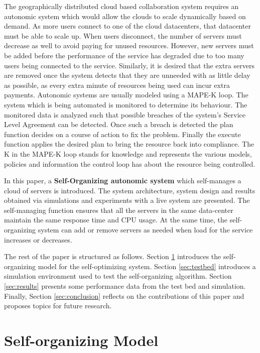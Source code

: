 \documentclass[conference]{IEEEtran}
\begin{document}
The geographically distributed cloud based collaboration system requires an autonomic system which would allow the clouds to scale dynamically based on demand. As more users connect to one of the cloud datacenters, that datacenter must be able to scale up. When users disconnect, the number of servers must decrease as well to avoid paying for unused resources. However, new servers must be added before the performance of the service has degraded due to too many users being connected to the service. Similarly, it is desired that the extra servers are removed once the system detects that they are unneeded with as little delay as possible, as every extra minute of resources being used can incur extra payments. Autonomic systems are usually modeled using a MAPE-K loop. The system which is being automated is monitored to determine its behaviour. The monitored data is analyzed such that possible breaches of the system's Service Level Agreement can be detected. Once such a breach is detected the plan function decides on a course of action to fix the problem. Finally the execute function applies the desired plan to bring the resource back into compliance. The K in the MAPE-K loop stands for knowledge and represents the various models, policies and information the control loop has about the resource being controlled.

In this paper, a \textbf{Self-Organizing autonomic system} which self-manages a cloud of servers is introduced. The system architecture, system design and results obtained via simulations and experiments with a live system are presented. The self-managing function ensures that all the servers in the same data-center maintain the same response time and CPU usage. At the same time, the self-organizing system can add or remove servers as needed when load for the service increases or decreases.

The rest of the paper is structured as follows. Section \ref{sec:selforganizingmodel} introduces the self-organizing model for the self-optimizing system. Section \ref{sec:testbed} introduces a simulation environment used to test the self-organizing algorithm. Section \ref{sec:results} presents some performance data from the test bed and simulation. Finally, Section \ref{sec:conclusion} reflects on the contributions of this paper and proposes topics for future research.

\section{Self-organizing Model}
\label{sec:selforganizingmodel}
 
\end{document}
